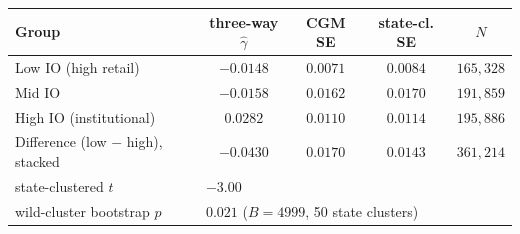 \begin{tabular}{lcccc}
\hline\hline
Group & three-way $\hat\gamma$ & CGM SE & state-cl. SE & $N$ \\
\hline
Low IO (high retail) & $-0.0148$ & $0.0071$ & $0.0084$ & $165,328$ \\
Mid IO & $-0.0158$ & $0.0162$ & $0.0170$ & $191,859$ \\
High IO (institutional) & $0.0282$ & $0.0110$ & $0.0114$ & $195,886$ \\
\hline
Difference (low $-$ high), stacked & $-0.0430$ & $0.0170$ & $0.0143$ & $361,214$ \\
\quad state-clustered $t$ & \multicolumn{4}{l}{$-3.00$} \\
\quad wild-cluster bootstrap $p$ & \multicolumn{4}{l}{$0.021$ ($B=4999$, 50 state clusters)} \\
\hline\hline
\end{tabular}
